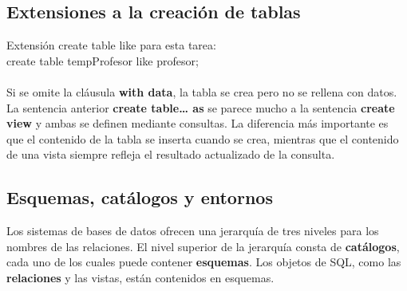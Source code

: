 \documentclass{article}
\begin{document}
\subsection{Extensiones a la creación de tablas}
Extensión create table like para esta tarea: \\
create table tempProfesor like profesor; \\
\\
Si se omite la cláusula \textbf{with data}, la tabla se crea pero no se rellena con datos. \\
La sentencia anterior \textbf{create table… as} se parece mucho a la
sentencia \textbf{create view} y ambas se definen mediante consultas. La
diferencia más importante es que el contenido de la tabla se inserta
cuando se crea, mientras que el contenido de una vista siempre refleja el resultado actualizado de la consulta.

\subsection{Esquemas, catálogos y entornos}
Los sistemas de bases de datos ofrecen una jerarquía de tres niveles para los nombres de las relaciones. El nivel superior de la jerarquía consta de \textbf{catálogos}, cada uno de los cuales puede contener \textbf{esquemas}. Los objetos de SQL, como las \textbf{relaciones} y las vistas, están contenidos en esquemas. 

\newpage
\end{document}
